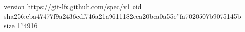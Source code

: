 version https://git-lfs.github.com/spec/v1
oid sha256:eba47477f9a2436cdf746a21a9611182eca20bca0a55e7fa7020507b9075145b
size 174916
